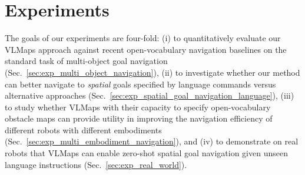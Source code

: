 \documentclass[letterpaper, 10 pt, conference]{ieeeconf}  %
\begin{document}
\section{Experiments}
The goals of our experiments are four-fold:
(i) to quantitatively evaluate our VLMaps approach against recent open-vocabulary navigation baselines on the standard task of multi-object goal navigation (Sec.~\ref{sec:exp_multi_object_navigation}),
(ii) to investigate whether our method can better navigate to \textit{spatial} goals specified by language commands versus alternative approaches (Sec.~\ref{sec:exp_spatial_goal_navigation_language}),
(iii) to study whether VLMaps with their capacity to specify open-vocabulary obstacle maps can provide utility in improving the navigation efficiency of different robots with different embodiments (Sec.~\ref{sec:exp_multi_embodiment_navigation}),
and (iv) to demonstrate on real robots that VLMaps can enable zero-shot spatial goal navigation given unseen language instructions (Sec.~\ref{sec:exp_real_world}).
\end{document}
